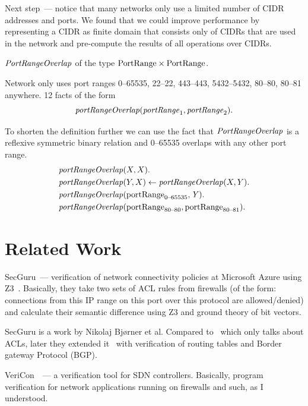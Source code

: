 Next step~--- notice that many networks only use a limited number of CIDR addresses and ports. We found that we could improve performance by representing a CIDR as finite domain that consists only of CIDRs that are used in the network and pre-compute the results of all operations over CIDRs.

$\mathit{PortRangeOverlap}$ of the type $\mathrm{PortRange} \times \mathrm{PortRange}$.

Network only uses port ranges 0--65535, 22--22, 443--443, 5432--5432, 80--80, 80--81 anywhere. 12 facts of the form $$\mathit{portRangeOverlap}(\mathit{portRange}_1,\mathit{portRange}_2).$$

To shorten the definition further we can use the fact that $\mathit{PortRangeOverlap}$ is a reflexive symmetric binary relation and 0--65535 overlaps with any other port range.
\begin{equation*}
\begin{aligned}
&\mathit{portRangeOverlap}(X,X).\\
&\mathit{portRangeOverlap}(Y,X)\leftarrow\mathit{portRangeOverlap}(X,Y).\\
&\mathit{portRangeOverlap}(\mathrm{portRange}_\text{0--65535},\mathit{Y}).\\
&\mathit{portRangeOverlap}(\mathrm{portRange}_\text{80--80},\mathrm{portRange}_\text{80--81}).\\
\end{aligned}
\end{equation*}

\section{Related Work}
\label{sect:aws/related}

SecGuru~--- verification of network connectivity policies at Microsoft Azure using Z3~\cite{jayaraman2014automated}. Basically, they take two sets of ACL rules from firewalls (of the form: connections from this IP range on this port over this protocol are allowed/denied) and calculate their semantic difference using Z3 and ground theory of bit vectors.

SecGuru is a work by Nikolaj Bj\o{}rner et al. Compared to~\cite{jayaraman2014automated} which only talks about ACLs, later they extended it~\cite{DBLP:conf/icdcit/BjornerJ15} with verification of routing tables and Border gateway Protocol (BGP). 

VeriCon~\cite{DBLP:conf/pldi/BallBGIKSSV14}~--- a verification tool for SDN controllers. Basically, program verification for network applications running on firewalls and such, as I understood.

